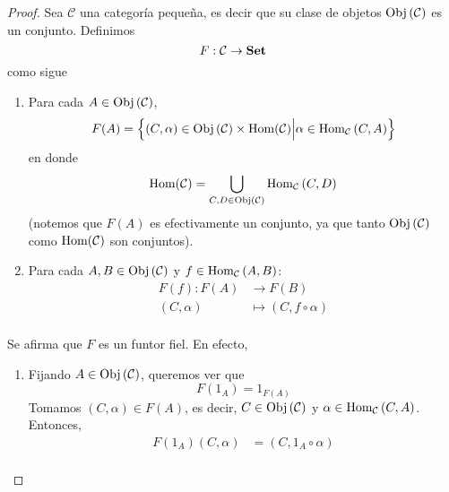\documentclass[12pt]{report}
\theoremstyle{largebreak}
\newcommand{\Obj}[1]{\ensuremath{\textup{Obj}\left(#1\right)}}
\newcommand{\Hom}[3]{\ensuremath{\textup{Hom}_{#1}\left(#2,#3\right)}}
\newcommand{\Cat}[1]{\ensuremath{\textup{\textbf{#1}}}}
\begin{document}
    \begin{proof}
        Sea $\mathcal{C}$ una categoría pequeña, es decir que su clase de objetos $\Obj{\mathcal{C}}$ es un conjunto. Definimos
        \begin{equation*}
            F:\mathcal{C}\rightarrow\Cat{Set}
        \end{equation*}
        como sigue
        \begin{enumerate}
            \item Para cada $A\in\Obj{\mathcal{C}}$,
            \begin{equation*}
                F(A)=\left\{(C,\alpha)\in\Obj{\mathcal{C}}\times\textup{Hom}(\mathcal{C}) \Big|\alpha\in\Hom{\mathcal{C}}{C}{A}  \right\}
            \end{equation*}
            en donde
            \begin{equation*}
                \textup{Hom}(\mathcal{C})=\bigcup_{ C,D\in\Obj{\mathcal{C}}}\Hom{\mathcal{C}}{C}{D}
            \end{equation*}
            (notemos que $F(A)$ es efectivamente un conjunto, ya que tanto $\Obj{\mathcal{C}}$ como $\textup{Hom}(\mathcal{C})$ son conjuntos).
            \item Para cada $A,B\in\Obj{\mathcal{C}}$ y $f\in\Hom{\mathcal{C}}{A}{B}$:
            \begin{equation*}
                \begin{split}
                    F(f):F(A)&\rightarrow F(B)\\
                    (C,\alpha)&\mapsto (C,f\circ \alpha)\\
                \end{split}
            \end{equation*}
        \end{enumerate}
        Se afirma que $F$ es un funtor fiel. En efecto,
        \renewcommand{\theenumi}{\roman{enumi}}
        \begin{enumerate}
            \item Fijando $A\in\Obj{\mathcal{C}}$, queremos ver que
            \begin{equation*}
                F(1_A)=1_{F(A)}
            \end{equation*}
            Tomamos $(C,\alpha)\in F(A)$, es decir, $C\in\Obj{\mathcal{C}}$ y $\alpha\in\Hom{\mathcal{C}}{C}{A}$. Entonces,
            \begin{equation*}
                \begin{split}
                    F(1_A)(C,\alpha)&=(C,1_A\circ\alpha)\\

\end{split}
\end{equation*}
\end{enumerate}
\end{proof}
\end{document}
